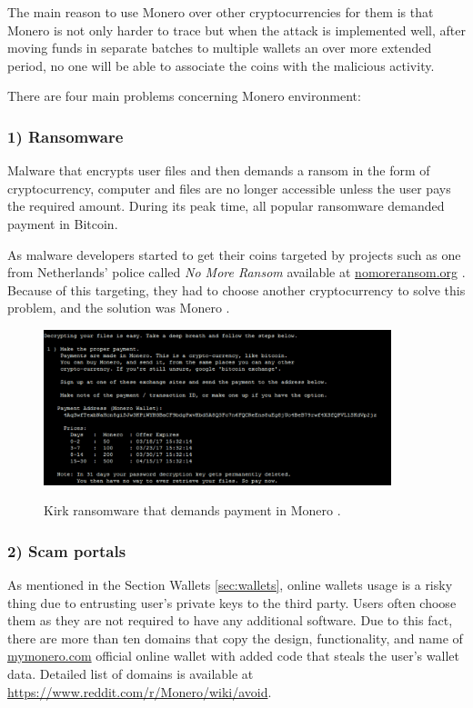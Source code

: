\documentclass[
  printed, %
  table,   %
  lof,     %
  lot,     %
           oneside, color
]{fithesis3}
\begin{document}
The main reason to use Monero over other cryptocurrencies for them is that Monero is not only harder to trace but when the attack is implemented well, after moving funds in separate batches to multiple wallets an over more extended period, no one will be able to associate the coins with the malicious activity.

There are four main problems concerning Monero environment:
\subsubsection{1) Ransomware} 
\label{cha:ransomware}
Malware that encrypts user files and then demands a ransom in the form of cryptocurrency, computer and files are no longer accessible unless the user pays the required amount. During its peak time, all popular ransomware demanded payment in Bitcoin. 

As malware developers started to get their coins targeted by projects such as one from Netherlands' police called \textit{No More Ransom} available at \url{nomoreransom.org} \cite{martin2017don,paquet2018ransomware}. 
Because of this targeting, they had to choose another cryptocurrency to solve this problem, and the solution was Monero \cite{cusack2018points}.

\begin{figure}[H]
\begin{center}

    \vspace{-0.8em}
 \includegraphics[trim={0 0 0 0},clip,width=0.9\textwidth]{stf-kirk-ransomware-virus-startrek-monero-payment-demands-ransom-instructions.png}
    \caption{Kirk ransomware that demands payment in Monero \protect\cite{monerokirk}.}
    \vspace{-1.5em}
    \label{pic:monerokirk}
\end{center}
    \end{figure}



\subsubsection{2) Scam portals}
\label{cha:scamportals}
As mentioned in the Section Wallets \ref{sec:wallets}, online wallets usage is a risky thing due to entrusting user's private keys to the third party. Users often choose them as they are not required to have any additional software. Due to this fact, there are more than ten domains that copy the design, functionality, and name of \url{mymonero.com} official online wallet with added code that steals the user's wallet data. Detailed list of domains is available at \url{https://www.reddit.com/r/Monero/wiki/avoid}.
\end{document}
